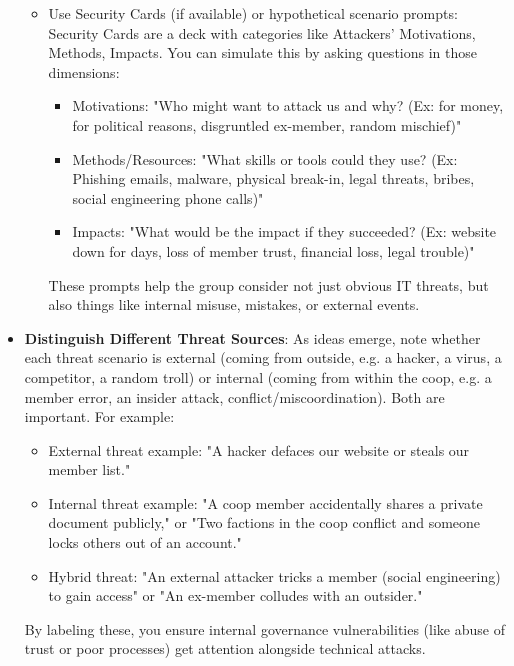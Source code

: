 \begin{itemize}
\begin{itemize}
        \item Use Security Cards (if available) or hypothetical scenario prompts: Security
        Cards are a deck with categories like Attackers' Motivations, Methods, Impacts.
        You can simulate this by asking questions in those dimensions:

        \begin{itemize}
            \item	Motivations: "Who might want to attack us and why? (Ex: for money, for political reasons,
            disgruntled ex-member, random mischief)"
            \item	Methods/Resources: "What skills or tools could they use? (Ex: Phishing emails, malware,
            physical break-in, legal threats, bribes, social engineering phone calls)"
            \item	Impacts: "What would be the impact if they succeeded? (Ex: website down for days, loss of
            member trust, financial loss, legal trouble)"
        \end{itemize}
        
        These prompts help the group consider not just obvious IT threats, but also
        things like internal misuse, mistakes, or external events.
    \end{itemize}

    \item \textbf{Distinguish Different Threat Sources}:
    As ideas emerge, note whether each threat
    scenario is external (coming from outside, e.g. a hacker, a virus, a competitor,
    a random troll) or internal (coming from within the coop, e.g. a member error,
    an insider attack, conflict/miscoordination). Both are important. For example:
    \begin{itemize}
        \item External threat example: "A hacker defaces our website or steals our member list."
        \item Internal threat example: "A coop member accidentally shares a private document publicly,"
        or "Two factions in the coop conflict and someone locks others out of an account."
        \item Hybrid threat: "An external attacker tricks a member (social engineering) to gain access"
        or "An ex-member colludes with an outsider."
    \end{itemize}

    By labeling these, you ensure internal governance vulnerabilities (like abuse of
    trust or poor processes) get attention alongside technical attacks.


\end{itemize}
